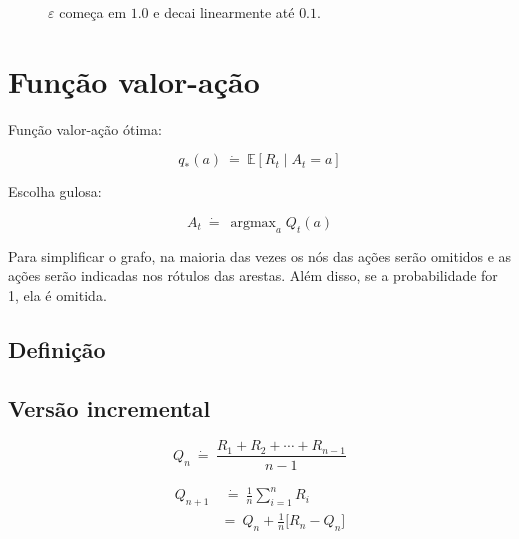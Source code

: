 \documentclass{article}
\DeclareMathOperator*{\argmax}{argmax}
\begin{document}
\begin{itemize}
\begin{figure}[ht]
                        \caption{$\varepsilon$ começa em $1.0$ e decai linearmente até $0.1$.}
                        \label{diag:epsilon-decay}
                    \end{figure}
                    
                \end{itemize}
            
    \section{Função valor-ação}
    
        Função valor-ação ótima:
    
        \begin{equation}
            q_*(a) \ \dot{=} \ \mathbb{E}[R_t \mid A_t = a]
        \end{equation}
    
        Escolha gulosa:
    
        \begin{equation}
            A_t \ \dot{=} \ \argmax_a Q_t(a)
        \end{equation}
        
        \begin{center}
        \mdpthreestate
        \end{center}
        
        Para simplificar o grafo, na maioria das vezes os nós das ações serão omitidos e as ações serão indicadas nos rótulos das arestas. Além disso, se a probabilidade for 1, ela é omitida.
        
        \subsection{Definição}
        
        \subsection{Versão incremental}
            
            \begin{equation}
                Q_n \ \dot{=} \ \frac{R_1 + R_2 + \cdots + R_{n-1}}{n - 1}
            \end{equation}
            
            \begin{equation}
            \begin{split}
                Q_{n+1} & \ \dot{=} \ \frac{1}{n} \sum_{i=1}^{n} R_i \\
                & = \ Q_n + \frac{1}{n} \Big[ R_n - Q_n \Big]
            \end{split}
            \end{equation}
            
\end{document}
